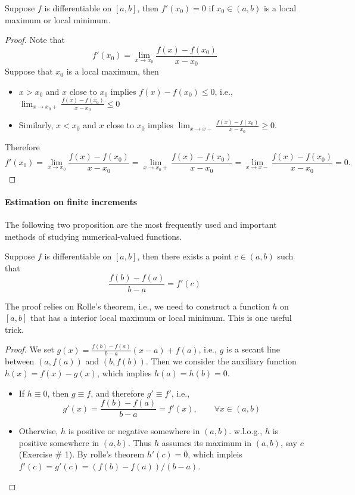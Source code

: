 \begin{theorem}
Suppose $f$ is differentiable on $[a,b]$, then $f'(x_0)=0$ if $x_0\in (a,b)$ is a local maximum or local minimum.
\end{theorem}
\begin{proof}
Note that
\[
f'(x_0)=\lim_{x\to x_0}\frac{f(x) - f(x_0)}{x-x_0}
\]
Suppose that $x_0$ is a local maximum, then
\begin{itemize}
\item
$x>x_0$ and $x$ close to $x_0$ implies $f(x) -f(x_0)\le0$, i.e., $\lim_{x\to x_0+}\frac{f(x) - f(x_0)}{x-x_0}\le0$
\item
Similarly, $x<x_0$ and $x$ close to $x_0$ implies $\lim_{x\to x-}\frac{f(x) - f(x_0)}{x-x_0}\ge0$.
\end{itemize}
Therefore 
\[
f'(x_0)=\lim_{x\to x_0}\frac{f(x) - f(x_0)}{x-x_0}=
\lim_{x\to x_0+}\frac{f(x) - f(x_0)}{x-x_0}
=
\lim_{x\to x-}\frac{f(x) - f(x_0)}{x-x_0}=0.
\]
\end{proof}
\paragraph{Estimation on finite increments}
The following two proposition are the most frequently used and important methods of studying numerical-valued functions.
\begin{theorem}
Suppose $f$ is differentiable on $[a,b]$, then there exists a point $c\in (a,b)$ such that
\[
\frac{f(b) - f(a)}{b-a}=f'(c)
\]
\end{theorem}
The proof relies on Rolle's theorem, i.e., we need to construct a function $h$ on $[a,b]$ that has a interior local maximum or local minimum. This is one useful trick.
\begin{proof}
We set $g(x) = \frac{f(b)  - f(a)}{b-a}(x-a)+f(a)$, i.e., $g$ is a secant line between $(a,f(a))$ and $(b,f(b))$. Then we consider the auxiliary function $h(x)=f(x)-g(x)$, which implies $h(a)=h(b)=0$.
\begin{itemize}
\item
If $h\equiv0$, then $g\equiv f$, and therefore $g'\equiv f'$, i.e., 
\[
g'(x)=\frac{f(b) - f(a)}{b-a}=f'(x), \qquad\forall x\in(a,b)
\]
\item
Otherwise, $h$ is positive or negative somewhere in $(a,b)$. w.l.o.g., $h$ is positive somewhere in $(a,b)$. Thus $h$ assumes its maximum in $(a,b)$, say $c$ (Exercise $\#$ 1). By rolle's theorem $h'(c)=0$, which impleis $f'(c) = g'(c)=(f(b) - f(a))/(b-a).$
\end{itemize}
\end{proof}
